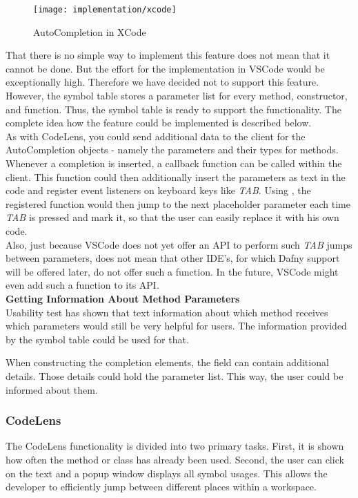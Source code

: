 \begin{figure}[H]
    \centering
    \texttt{[image: implementation/xcode]}
    \caption{AutoCompletion in XCode}
    \label{fig:xcode_completion}
\end{figure}

That there is no simple way to implement this feature does not mean that it cannot be done.
But the effort for the implementation in VSCode would be exceptionally high.
Therefore we have decided not to support this feature.
However, the symbol table stores a parameter list for every method, constructor, and function.
Thus, the symbol table is ready to support the functionality.
The complete idea how the feature could be implemented is described below. \\

As with CodeLens, you could send additional data to the client
for the AutoCompletion objects - namely the parameters and their types for methods.
Whenever a completion is inserted, a callback function can be called within the client.
This function could then additionally insert the parameters as text in the code and register
event listeners on keyboard keys like \textit{TAB}.
Using , the registered function would then jump to the next placeholder parameter
each time \textit{TAB} is pressed and mark it, so that the user can easily replace it with his own code. \\

Also, just because VSCode does not yet offer an API to perform such \textit{TAB} jumps between parameters,
does not mean that other IDE's, for which Dafny support will be offered later,
do not offer such a function.
In the future, VSCode might even add such a function to its API. \\

\textbf{Getting Information About Method Parameters} \\
Usability test has shown that text information about which method
receives which parameters would still be very helpful for users.
The information provided by the symbol table could be used for that.

When constructing the completion elements,
the field  can contain additional details.
Those details could hold the parameter list.
This way, the user could be informed about them.\\


\subsubsection{CodeLens}
\label{section:implementation:features:codelens}
The CodeLens functionality is divided into two primary tasks.
First, it is shown how often the method or class has already been used.
Second, the user can click on the text and a popup window displays all symbol usages.
This allows the developer to efficiently jump between different places within a workspace.\\

